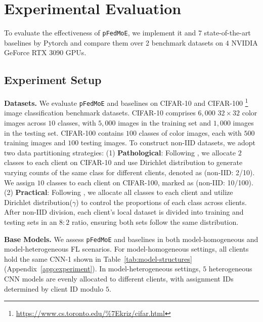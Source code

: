 \documentclass[sigconf]{acmart}
\newcommand{\hetero}{heterogeneous }
\newcommand{\homo}{homogeneous }
\newcommand{\methodname}{{\tt{pFedMoE}}}
\begin{document}
\section{Experimental Evaluation}

To evaluate the effectiveness of \methodname{}, we implement it and $7$ state-of-the-art baselines by Pytorch and compare them over 2 benchmark datasets on $4$ NVIDIA GeForce RTX 3090 GPUs.


\subsection{Experiment Setup}

\textbf{Datasets.} We evaluate \methodname{} and baselines on CIFAR-10 and CIFAR-100 \footnote{\url{https://www.cs.toronto.edu/\%7Ekriz/cifar.html}} \cite{cifar} image classification benchmark datasets. CIFAR-10 comprises $6,000$ $32\times32$ color images across $10$ classes, with $5,000$ images in the training set and $1,000$ images in the testing set. CIFAR-100 contains $100$ classes of color images, each with $500$ training images and $100$ testing images. 
To construct non-IID datasets, we adopt two data partitioning strategies: (1) \textbf{Pathological}: Following \cite{pFedHN}, we allocate $2$ classes to each client on CIFAR-10 and use Dirichlet distribution to generate varying counts of the same class for different clients, denoted as (non-IID: 2/10). We assign $10$ classes to each client on CIFAR-100, marked as (non-IID: 10/100). (2) \textbf{Practical}: Following \citet{FedAPEN}, we allocate all classes to each client and utilize Dirichlet distribution($\gamma$) to control the proportions of each class across clients.
After non-IID division, each client's local dataset is divided into training and testing sets in an $8:2$ ratio, ensuring both sets follow the same distribution.


\textbf{Base Models.} We assess \methodname{} and baselines in both model-\homo and model-\hetero FL scenarios. For model-\homo settings, all clients hold the same CNN-1 shown in Table~\ref{tab:model-structures} (Appendix~\ref{app:experiment}). In model-\hetero settings, $5$ \hetero CNN models are evenly allocated to different clients, with assignment IDs determined by client ID modulo $5$.
\end{document}
